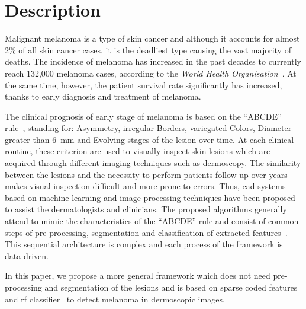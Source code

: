 \graphicspath{ {./content/intro/figures/} }

\section{Description}
\label{sec:descr}  %
Malignant melanoma is a type of skin cancer and although it accounts for almost 2\% of all skin cancer
cases, it is the deadliest type causing the vast majority of deaths. 
The incidence of melanoma has increased in the past decades to currently reach 132,000 melanoma cases, according to the \textit{World Health Organisation}~\cite{WoH}.
At the same time, however, the patient survival rate significantly has increased, thanks to early diagnosis and treatment of melanoma.

The clinical prognosis of early stage of melanoma is based on the ``ABCDE'' rule~\cite{abbasi2004early}, standing for: Asymmetry, irregular Borders, variegated Colors, Diameter greater than \SI{6}{\milli \meter} and Evolving stages of the lesion over time.
At each clinical routine, these criterion are used to visually inspect skin lesions which are acquired through different imaging techniques such as dermoscopy.
The similarity between the lesions and the necessity to perform patients follow-up over years makes visual inspection difficult and more prone to errors.
Thus, \ac{cad} systems based on machine learning and image processing techniques have been proposed to assist the dermatologists and clinicians. 
The proposed algorithms generally attend to mimic the characteristics of the ``ABCDE'' rule and consist of common steps of pre-processing, segmentation and classification of extracted features~\cite{rastgoo2015automatic}.
This sequential architecture is complex and each process of the framework is data-driven. 

In this paper, we propose a more general framework which does not need pre-processing and segmentation of the lesions and is based on sparse coded features and \ac{rf} classifier~\cite{breiman2001random} to detect melanoma in dermoscopic images.



